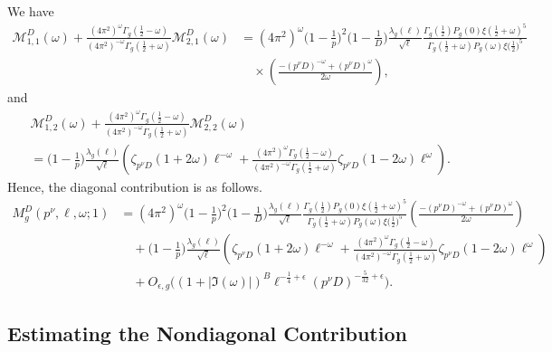 \documentclass[12pt]{amsart}
\theoremstyle{plain}
\theoremstyle{definition}
\begin{document}
We have 
  \begin{align*}
     \mathcal{M}_{1, 1}^D(\omega)
    + \frac{(4\pi^2)^{\omega} \Gamma_g(\frac12-\omega)}{(4\pi^2)^{-\omega} \Gamma_g(\frac12+\omega)}  \mathcal{M}_{2, 1}^D(\omega)
    & =      
      \left(4\pi^2\right)^\omega \Big(1-\frac{1}{p}\Big)^2   \Big(1-\frac{1}{D}\Big) \frac{ \lambda_g(\ell)}{\sqrt\ell} 
       \frac{\Gamma_g\left(\frac12\right)P_g(0)\xi\left(\frac12+\omega\right)^5}{\Gamma_g\left(\frac12+\omega\right)P_g(\omega)\xi\big(\frac12\big)^5}
       \\
     &\quad \times \left(\frac{-(p^\nu D)^{-\omega}+(p^\nu D)^\omega}{2\omega}\right),     \end{align*}
and 
  \begin{align*}
    & \mathcal{M}_{1, 2}^D(\omega)
    + \frac{(4\pi^2)^{\omega} \Gamma_g(\frac12-\omega)}{(4\pi^2)^{-\omega} \Gamma_g(\frac12+\omega)}  \mathcal{M}_{2, 2}^D(\omega)
    \\& =     \Big(1-\frac{1}{p}\Big) \frac{ \lambda_g(\ell)}{\sqrt\ell} \left( 
     \zeta_{p^\nu D} (1+2\omega)\ell^{-\omega}
  +  \frac{(4\pi^2)^{\omega} \Gamma_g(\frac12-\omega)}{(4\pi^2)^{-\omega} \Gamma_g(\frac12+\omega)}     \zeta_{p^\nu D} (1-2\omega)
   \ell^{\omega}\right).
    \end{align*}
Hence, the diagonal contribution is as follows.
\begin{align}\label{eqn:1st-moment-D}
M_g^D(p^{\nu},\ell, \omega;1)&=  \left(4\pi^2\right)^\omega \Big(1-\frac{1}{p}\Big)^2   \Big(1-\frac{1}{D}\Big) \frac{ \lambda_g(\ell)}{\sqrt\ell} 
       \frac{\Gamma_g\left(\frac12\right)P_g(0)\xi\left(\frac12+\omega\right)^5}{\Gamma_g\left(\frac12+\omega\right)P_g(\omega)\xi\big(\frac12\big)^5}
        \left(\frac{-(p^\nu D)^{-\omega}+(p^\nu D)^\omega}{2\omega}\right)\nonumber \\&\quad+ \Big(1-\frac{1}{p}\Big) \frac{ \lambda_g(\ell)}{\sqrt\ell} \left( 
     \zeta_{p^\nu D} (1+2\omega)\ell^{-\omega}
  +  \frac{(4\pi^2)^{\omega} \Gamma_g(\frac12-\omega)}{(4\pi^2)^{-\omega} \Gamma_g(\frac12+\omega)}     \zeta_{p^\nu D} (1-2\omega)
   \ell^{\omega}\right)\\&\quad+O_{\epsilon, g}\Big((1+|\Im(\omega)|)^B \ell^{-\frac14+\epsilon} (p^\nu D)^{-\frac{5}{32}+\epsilon}\Big).\nonumber
\end{align}

 

\subsection{Estimating the Nondiagonal Contribution}
\end{document}
